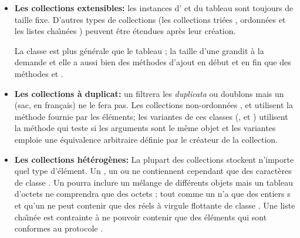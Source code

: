 \documentclass[a4paper,10pt,twoside]{book}
\begin{document}
\begin{itemize}
  \item {\bf Les collections extensibles:}
	les instances d' et du tableau  sont
toujours de taille fixe. D'autres types de collections (les collections tri\'ees , ordonn\'ees  et les listes cha\^{\i}n\'ees ) peuvent \^etre \'etendues apr\`es leur cr\'eation.
	
	La classe  est plus g\'en\'erale que le tableau \mbox{;} la taille d'une  grandit \`a la demande et
elle a aussi bien des m\'ethodes d'ajout en d\'ebut  et en fin  que des m\'ethodes
 et .
  
  \item {\bf Les collections \`a duplicat:}
  	un  filtrera les \emph{duplicata} ou doublons mais un  (sac, en fran\c{c}ais) ne le fera pas.
	Les collections non-ordonn\'ees ,  et  utilisent la m\'ethode
\ct{=} fournie par les \'el\'ements; les variantes  de ces
classes (,  et )
utilisent la m\'ethode \ct{==} qui teste si les arguments sont 
le m\^eme objet et les variantes  emploie une \'equivalence
arbitraire d\'efinie par le cr\'eateur de la collection.

  \item {\bf Les collections h\'et\'erog\`enes:}
	La plupart des collections stockent n'importe quel type d'\'el\'ement.
	Un , un  ou  ne contiennent cependant que des caract\`eres de classe .
	Un  pourra inclure un m\'elange de diff\'erents objets
 mais un tableau d'octets  ne comprendra que des 
octets ; tout comme un  n'a que des entiers s et qu'un  ne peut contenir que des r\'eels \`a virgule flottante de classe .
	Une liste cha\^{\i}n\'ee  est contrainte \`a ne 
pouvoir contenir que des \'el\'ements qui sont conformes au protocole
.

\end{itemize}

\end{document}
